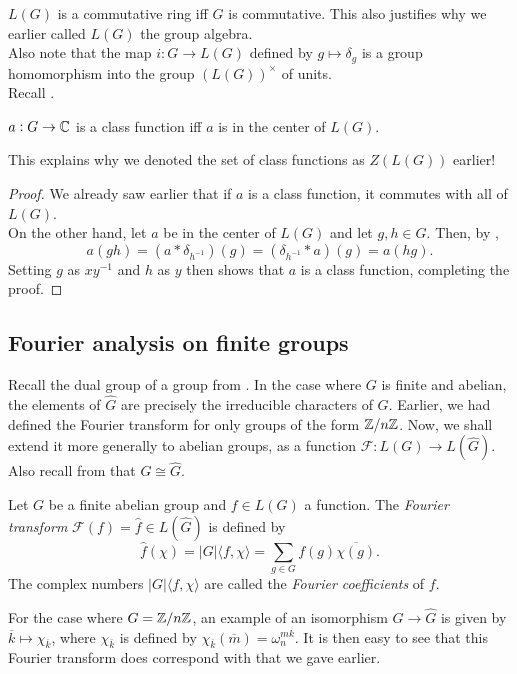 			$L(G)$ is a commutative ring iff $G$ is commutative. This also justifies why we earlier called $L(G)$ the group algebra.\\
			Also note that the map $i : G \to L(G)$ defined by $g \mapsto \delta_g$ is a group homomorphism into the group $(L(G))^\times$ of units.\\
			Recall .

			\begin{fprop}
				$a : G \to \mathbb{C}$ is a class function iff $a$ is in the center of $L(G)$.
			\end{fprop}
			This explains why we denoted the set of class functions as $Z(L(G))$ earlier!
			\begin{proof}
				We already saw earlier that if $a$ is a class function, it commutes with all of $L(G)$.\\
				On the other hand, let $a$ be in the center of $L(G)$ and let $g,h \in G$. Then, by ,
				\[ a(gh) = (a * \delta_{h^{-1}})(g) = (\delta_{h^{-1}} * a) (g) = a(hg). \]
				Setting $g$ as $xy^{-1}$ and $h$ as $y$ then shows that $a$ is a class function, completing the proof.
			\end{proof}

	\subsection{Fourier analysis on finite groups}

		Recall the dual group of a group from . In the case where $G$ is finite and abelian, the elements of $\hat{G}$ are precisely the irreducible characters of $G$. Earlier, we had defined the Fourier transform for only groups of the form $\mathbb{Z}/n\mathbb{Z}$. Now, we shall extend it more generally to abelian groups, as a function $\mathcal{F} : L(G) \to L(\hat{G})$. Also recall from  that $G \cong \hat{G}$.

		\begin{fdef}
			Let $G$ be a finite abelian group and $f \in L(G)$ a function. The \emph{Fourier transform} $\mathcal{F}(f) = \hat{f} \in L(\hat{G})$ is defined by
			\[ \hat{f}(\chi) = |G|\langle f,\chi\rangle = \sum_{g \in G} f(g) \overline{\chi(g)}. \]
			The complex numbers $|G| \langle f,\chi\rangle$ are called the \emph{Fourier coefficients} of $f$.
		\end{fdef}

		For the case where $G = \mathbb{Z}/n\mathbb{Z}$, an example of an isomorphism $G \to \hat{G}$ is given by $\overline{k} \mapsto \chi_{\overline{k}}$, where $\chi_{\overline{k}}$ is defined by $\chi_{\overline{k}}(\overline{m}) = \omega_n^{mk}$. It is then easy to see that this Fourier transform does correspond with that we gave earlier.\\

